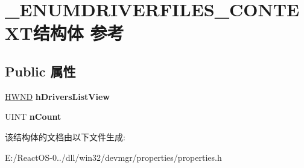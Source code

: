 \hypertarget{struct___e_n_u_m_d_r_i_v_e_r_f_i_l_e_s___c_o_n_t_e_x_t}{}\section{\+\_\+\+E\+N\+U\+M\+D\+R\+I\+V\+E\+R\+F\+I\+L\+E\+S\+\_\+\+C\+O\+N\+T\+E\+X\+T结构体 参考}
\label{struct___e_n_u_m_d_r_i_v_e_r_f_i_l_e_s___c_o_n_t_e_x_t}
\subsection*{Public 属性}
\begin{DoxyCompactItemize}
\item 
\mbox{\label{struct___e_n_u_m_d_r_i_v_e_r_f_i_l_e_s___c_o_n_t_e_x_t_ab700d67268cd8d7e18d3ea632a06b8f5}} 
\hyperlink{interfacevoid}{H\+W\+ND} {\bfseries h\+Drivers\+List\+View}
\item 
\mbox{\label{struct___e_n_u_m_d_r_i_v_e_r_f_i_l_e_s___c_o_n_t_e_x_t_a9ac85aa0ce8637eab7966d6e3b99df65}} 
U\+I\+NT {\bfseries n\+Count}
\end{DoxyCompactItemize}


该结构体的文档由以下文件生成\+:\begin{DoxyCompactItemize}
\item 
E\+:/\+React\+O\+S-\/0../dll/win32/devmgr/properties/properties.\+h\end{DoxyCompactItemize}
